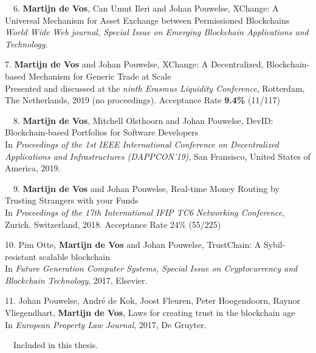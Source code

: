 \begin{etaremune}
{\item[\faFileTextO~~6.] \textbf{Martijn de Vos}, Can Umut Ileri and Johan Pouwelse, XChange: A Universal Mechanism for Asset Exchange between Permissioned Blockchains\\
\emph{World Wide Web journal, Special Issue on Emerging Blockchain Applications and Technology.}

\item[7.] \textbf{Martijn de Vos} and Johan Pouwelse, XChange: A Decentralized, Blockchain-based Mechanism for Generic Trade at Scale\\
Presented and discussed at the \emph{ninth Erasmus Liquidity Conference}, Rotterdam, The Netherlands, 2019 (no proceedings). Acceptance Rate \textbf{9.4\%} (11/117)

\item[\faFileTextO~~8.] \textbf{Martijn de Vos}, Mitchell Olsthoorn and Johan Pouwelse, DevID: Blockchain-based Portfolios for Software Developers\\
In \emph{Proceedings of the 1st IEEE International Conference on Decentralized Applications and Infrastructures (DAPPCON'19)}, San Fransisco, United States of America, 2019.

\item[\faFileTextO~~9.] \textbf{Martijn de Vos} and Johan Pouwelse, Real-time Money Routing by Trusting Strangers with your Funds\\
In \emph{Proceedings of the 17th International IFIP TC6 Networking Conference}, Zurich, Switzerland, 2018. Acceptance Rate 24\% (55/225)

\item[10.] Pim Otte, \textbf{Martijn de Vos} and Johan Pouwelse, TrustChain: A Sybil-resistant scalable blockchain\\
In \emph{Future Generation Computer Systems, Special Issue on Cryptocurrency and Blockchain Technology}, 2017, Elsevier.

\item[11.] Johan Pouwelse, André de Kok, Joost Fleuren, Peter Hoogendoorn, Raynor Vliegendhart, \textbf{Martijn de Vos}, Laws for creating trust in the blockchain age\\
In \emph{European Property Law Journal}, 2017, De Gruyter.

}\end{etaremune}

\vspace{0.5cm}
\noindent
\faFileTextO~~Included in this thesis.\\
